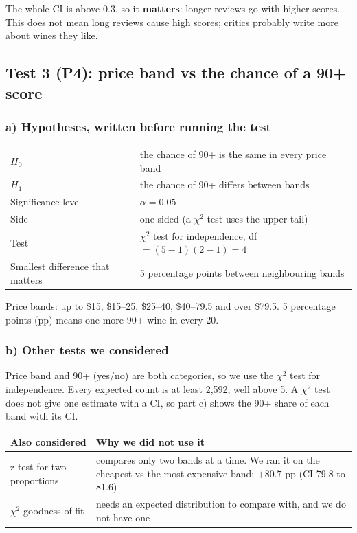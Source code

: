 \documentclass[10pt,a4paper,twocolumn]{article}
\begin{document}
The whole CI is above 0.3, so it \textbf{matters}: longer reviews go with higher scores. This does not mean long
reviews cause high scores; critics probably write more about wines they like.

\subsection*{Test 3 (P4): price band vs the chance of a 90+ score}

\subsubsection*{a) Hypotheses, written before running the test}
{\small
\begin{tabularx}{\columnwidth}{@{}HL@{}}
\toprule
$H_0$ & the chance of 90+ is the same in every price band\\
$H_1$ & the chance of 90+ differs between bands\\
Significance level & $\alpha = 0.05$\\
Side & one-sided (a $\chi^2$ test uses the upper tail)\\
Test & $\chi^2$ test for independence, df $= (5-1)(2-1) = 4$\\
Smallest difference that matters & 5 percentage points between neighbouring bands\\
\bottomrule
\end{tabularx}\par}

Price bands: up to \$15, \$15--25, \$25--40, \$40--79.5 and over \$79.5. 5 percentage points (pp) means one more 90+
wine in every 20.

\subsubsection*{b) Other tests we considered}
Price band and 90+ (yes/no) are both categories, so we use the $\chi^2$ test for independence. Every expected count is
at least 2,592, well above 5. A $\chi^2$ test does not give one estimate with a CI, so part c) shows the 90+ share of
each band with its CI.

{\footnotesize
\begin{tabularx}{\columnwidth}{@{}P{23mm}L@{}}
\toprule
\textbf{Also considered} & \textbf{Why we did not use it}\\
\midrule
z-test for two proportions & compares only two bands at a time. We ran it on the cheapest vs the most expensive band:
$+80.7$ pp (CI 79.8 to 81.6)\\
$\chi^2$ goodness of fit & needs an expected distribution to compare with, and we do not have one\\
\bottomrule
\end{tabularx}\par}
\end{document}
